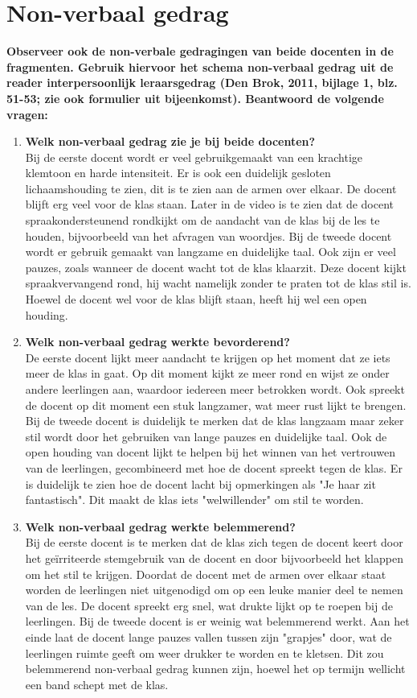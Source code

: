 \documentclass{article}
\begin{document}
    \section{Non-verbaal gedrag}
        \textbf{Observeer ook de non-verbale gedragingen van beide docenten in de fragmenten. Gebruik hiervoor het schema non-verbaal gedrag uit de reader interpersoonlijk leraarsgedrag (Den Brok, 2011, bijlage 1, blz. 51-53; zie ook formulier uit bijeenkomst). Beantwoord de volgende vragen:}
        \begin{enumerate}[label=(\alph*)]
            \item \textbf{Welk non-verbaal gedrag zie je bij beide docenten?}\\ 
            Bij de eerste docent wordt er veel gebruikgemaakt van een krachtige klemtoon en harde intensiteit. Er is ook een duidelijk gesloten lichaamshouding te zien, dit is te zien aan de armen over elkaar. De docent blijft erg veel voor de klas staan. Later in de video is te zien dat de docent spraakondersteunend rondkijkt om de aandacht van de klas bij de les te houden, bijvoorbeeld van het afvragen van woordjes.
            Bij de tweede docent wordt er gebruik gemaakt van langzame en duidelijke taal. Ook zijn er veel pauzes, zoals wanneer de docent wacht tot de klas klaarzit. Deze docent kijkt spraakvervangend rond, hij wacht namelijk zonder te praten tot de klas stil is. Hoewel de docent wel voor de klas blijft staan, heeft hij wel een open houding.
            \item \textbf{Welk non-verbaal gedrag werkte bevorderend?} \\
            De eerste docent lijkt meer aandacht te krijgen op het moment dat ze iets meer de klas in gaat. Op dit moment kijkt ze meer rond en wijst ze onder andere leerlingen aan, waardoor iedereen meer betrokken wordt. Ook spreekt de docent op dit moment een stuk langzamer, wat meer rust lijkt te brengen.
            Bij de tweede docent is duidelijk te merken dat de klas langzaam maar zeker stil wordt door het gebruiken van lange pauzes en duidelijke taal. Ook de open houding van docent lijkt te helpen bij het winnen van het vertrouwen van de leerlingen, gecombineerd met hoe de docent spreekt tegen de klas. Er is duidelijk te zien hoe de docent lacht bij opmerkingen als "Je haar zit fantastisch". Dit maakt de klas iets "welwillender" om stil te worden.
            \item \textbf{Welk non-verbaal gedrag werkte belemmerend?} \\
            Bij de eerste docent is te merken dat de klas zich tegen de docent keert door het geïrriteerde stemgebruik van de docent en door bijvoorbeeld het klappen om het stil te krijgen. Doordat de docent met de armen over elkaar staat worden de leerlingen niet uitgenodigd om op een leuke manier deel te nemen van de les. De docent spreekt erg snel, wat drukte lijkt op te roepen bij de leerlingen.
            Bij de tweede docent is er weinig wat belemmerend werkt. Aan het einde laat de docent lange pauzes vallen tussen zijn "grapjes" door, wat de leerlingen ruimte geeft om weer drukker te worden en te kletsen. Dit zou belemmerend non-verbaal gedrag kunnen zijn, hoewel het op termijn wellicht een band schept met de klas. 
        \end{enumerate}
\end{document}
